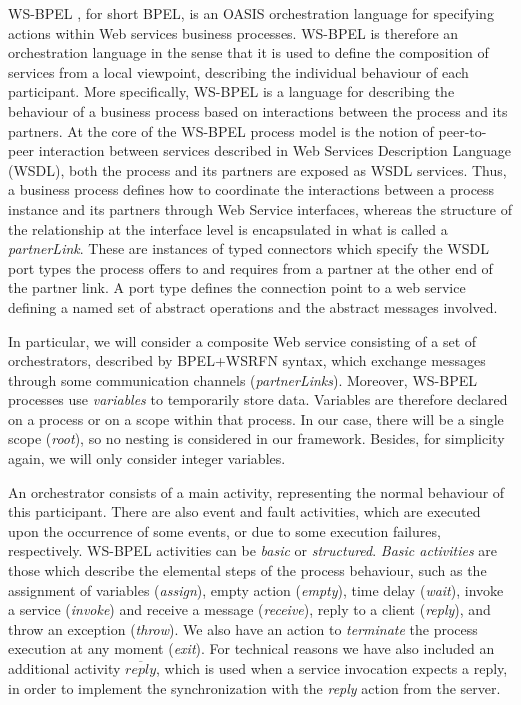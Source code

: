 WS-BPEL \cite{BPEL4WS}, for short BPEL, 
is an OASIS orchestration language for specifying actions within 
Web services business processes. WS-BPEL is therefore an orchestration
language in the sense that it is used to define the composition
of services from a local viewpoint, describing the individual
behaviour of each participant. More specifically, WS-BPEL is a language for describing the behaviour of a business process based on interactions between the process and its partners. At the core of the WS-BPEL process model is the notion of peer-to-peer interaction between services described in Web Services Description Language (WSDL), both the process and its partners are exposed as WSDL services. Thus, a business process defines how to coordinate the interactions between a process instance and its partners through Web Service interfaces, whereas the structure of the relationship at the interface level is encapsulated in what is called a \emph{partnerLink}. These are instances of typed connectors which specify the WSDL port 
types the process offers to and 
requires from a partner at the other end of the partner link. A port type  defines the connection point to a web service defining a named set of abstract operations and the abstract messages involved. 

In particular, 
we will consider a composite Web service consisting of a set of 
orchestrators, described by BPEL+WSRFN syntax, which
exchange messages through some communication channels ({\em partnerLinks}). Moreover, WS-BPEL processes use {\em variables} to temporarily store 
data. Variables are therefore declared on a process or on a scope 
within that process. In our case, there will be a single scope
({\em root}), so no nesting is considered in our framework.
Besides, for simplicity again, we will only consider integer
variables.

An orchestrator consists of a main activity, representing
the normal behaviour of this participant. There are also
event and fault activities, which are executed upon the
occurrence of some events, or due to some execution failures,
respectively. WS-BPEL activities 
can be \emph{basic} or \emph{structured}. 
\emph{Basic activities} are those which describe the elemental 
steps of the process behaviour, such as the assignment of
variables ({\em assign}), empty action ({\em empty}), 
time delay ({\em wait}), invoke a service ({\em invoke}) and receive
a message ({\em receive}), reply to a client ({\em reply}),
and throw an exception ({\em throw}). We also have an action to {\em terminate}
the process execution at any moment ({\em exit}).
For technical reasons we have also included an additional activity {\em $\overline{reply}$}, which is used when a service invocation
expects a reply, in order to implement the synchronization with
the {\em reply} action from the server.  


